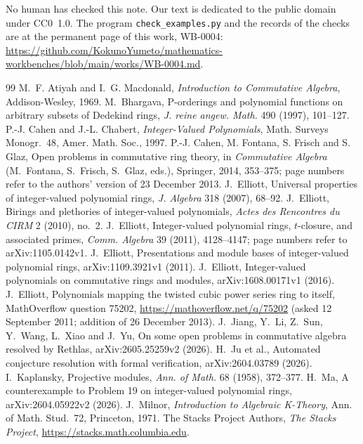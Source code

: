 \documentclass[11pt,a4paper]{article}
\theoremstyle{plain}
\theoremstyle{remark}
\newcommand{\workbenchurl}{https://github.com/KokunoYumeto/mathematics-workbenches/blob/main/works/WB-0004.md}
\begin{document}
No human has checked this note. Our text is dedicated to the public domain under CC0~1.0. The program
\texttt{check\_examples.py} and the records of the checks are at the permanent page of this work, WB-0004:
\url{\workbenchurl}.

\begin{thebibliography}{99}\small
{} M.~F. Atiyah and I.~G. Macdonald, \emph{Introduction to Commutative Algebra}, Addison-Wesley, 1969.
 M.~Bhargava, P-orderings and polynomial functions on arbitrary subsets of Dedekind rings,
\emph{J. reine angew. Math.} 490 (1997), 101--127.
 P.-J. Cahen and J.-L. Chabert, \emph{Integer-Valued Polynomials}, Math. Surveys Monogr.~48, Amer. Math.
Soc., 1997.
 P.-J. Cahen, M. Fontana, S. Frisch and S. Glaz, Open problems in commutative ring theory, in
\emph{Commutative Algebra} (M.~Fontana, S.~Frisch, S.~Glaz, eds.), Springer, 2014, 353--375; page numbers refer to
the authors' version of 23 December 2013.
 J.~Elliott, Universal properties of integer-valued polynomial rings, \emph{J. Algebra} 318 (2007),
68--92.
 J.~Elliott, Birings and plethories of integer-valued polynomials, \emph{Actes des Rencontres du CIRM}
2 (2010), no.~2.
 J.~Elliott, Integer-valued polynomial rings, $t$-closure, and associated primes, \emph{Comm.
Algebra} 39 (2011), 4128--4147; page numbers refer to arXiv:1105.0142v1.
 J.~Elliott, Presentations and module bases of integer-valued polynomial rings, arXiv:1109.3921v1
(2011).
 J.~Elliott, Integer-valued polynomials on commutative rings and modules, arXiv:1608.00171v1 (2016).
 J.~Elliott, Polynomials mapping the twisted cubic power series ring to itself, MathOverflow question
75202, \url{https://mathoverflow.net/q/75202} (asked 12 September 2011; addition of 26 December 2013).
 J.~Jiang, Y.~Li, Z.~Sun, Y.~Wang, L.~Xiao and J.~Yu, On some open problems in commutative algebra
resolved by Rethlas, arXiv:2605.25259v2 (2026).
 H.~Ju et al., Automated conjecture resolution with formal verification, arXiv:2604.03789 (2026).
 I.~Kaplansky, Projective modules, \emph{Ann. of Math.} 68 (1958), 372--377.
 H.~Ma, A counterexample to Problem 19 on integer-valued polynomial rings, arXiv:2604.05922v2 (2026).
 J.~Milnor, \emph{Introduction to Algebraic K-Theory}, Ann. of Math. Stud.~72, Princeton, 1971.
 The Stacks Project Authors, \emph{The Stacks Project}, \url{https://stacks.math.columbia.edu}.
\end{thebibliography}
\end{document}
